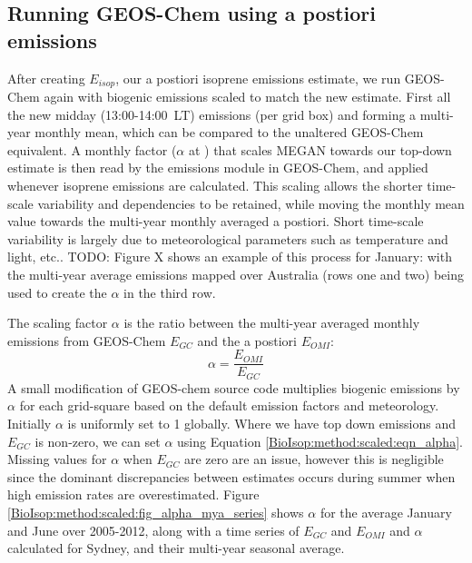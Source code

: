   \subsection{Running GEOS-Chem using a postiori emissions}
  \label{BioIsop:method:scaled}
    
    After creating $E_{isop}$, our a postiori isoprene emissions estimate, we run GEOS-Chem again with biogenic emissions scaled to match the new estimate. 
    First all the new midday (13:00-14:00~LT) emissions (per grid box) and forming a multi-year monthly mean, which can be compared to the unaltered GEOS-Chem equivalent.
    A monthly factor ($\alpha$ at \lowhr) that scales MEGAN towards our top-down estimate is then read by the emissions module in GEOS-Chem, and applied whenever isoprene emissions are calculated.
    This scaling allows the shorter time-scale variability and dependencies to be retained, while moving the monthly mean value towards the multi-year monthly averaged a postiori.
    Short time-scale variability is largely due to meteorological parameters such as temperature and light, etc..
    TODO: Figure X shows an example of this process for January: with the multi-year average emissions mapped over Australia (rows one and two) being used to create the $\alpha$ in the third row.
    
    
    The scaling factor $\alpha$ is the ratio between the multi-year averaged monthly emissions from GEOS-Chem $E_{GC}$ and the a postiori $E_{OMI}$: 
    \begin{equation} \label{BioIsop:method:scaled:eqn_alpha}
        \alpha = \frac{E_{OMI}}{E_{GC}}
    \end{equation}
    A small modification of GEOS-chem source code multiplies biogenic emissions by $\alpha$ for each grid-square based on the default emission factors and meteorology.
    Initially $\alpha$ is uniformly set to 1 globally.
    Where we have top down emissions and $E_{GC}$ is non-zero, we can set $\alpha$ using Equation \ref{BioIsop:method:scaled:eqn_alpha}.
    Missing values for $\alpha$ when $E_{GC}$ are zero are an issue, however this is negligible since the dominant discrepancies between estimates occurs during summer when high emission rates are overestimated.
    Figure \ref{BioIsop:method:scaled:fig_alpha_mya_series} shows $\alpha$ for the average January and June over 2005-2012, along with a time series of $E_{GC}$ and $E_{OMI}$ and $\alpha$ calculated for Sydney, and their multi-year seasonal average.
    
